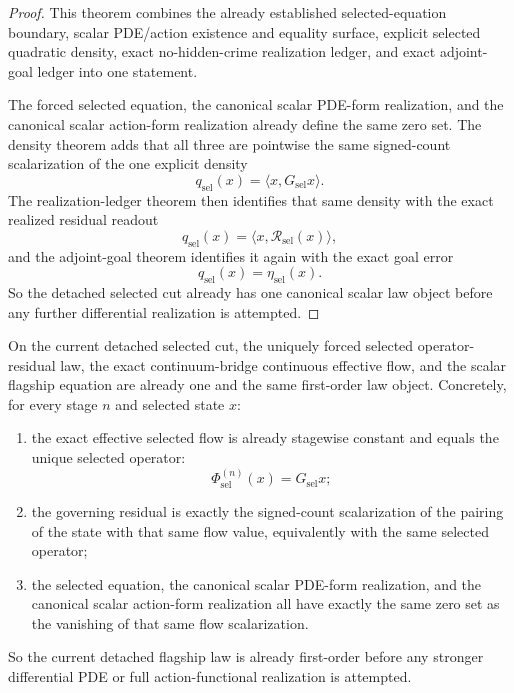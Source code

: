 \begin{proof}
This theorem combines the already established selected-equation boundary,
scalar PDE/action existence and equality surface, explicit selected quadratic
density, exact no-hidden-crime realization ledger, and exact adjoint-goal
ledger into one statement.

The forced selected equation, the canonical scalar PDE-form realization, and
the canonical scalar action-form realization already define the same zero set.
The density theorem adds that all three are pointwise the same signed-count
scalarization of the one explicit density
\[
q_{\mathrm{sel}}(x)=\langle x,G_{\mathrm{sel}}x\rangle.
\]
The realization-ledger theorem then identifies that same density with the exact
realized residual readout
\[
q_{\mathrm{sel}}(x)=\langle x,\mathcal R_{\mathrm{sel}}(x)\rangle,
\]
and the adjoint-goal theorem identifies it again with the exact goal error
\[
q_{\mathrm{sel}}(x)=\eta_{\mathrm{sel}}(x).
\]
So the detached selected cut already has one canonical scalar law object
before any further differential realization is attempted.
\end{proof}

\begin{theorem}
\label{thm:the-selected-cut-already-carries-one-canonical-first-order-law-object}
On the current detached selected cut, the uniquely forced selected
operator-residual law, the exact continuum-bridge continuous effective flow, and the
scalar flagship equation are already one and the same first-order law object.
Concretely, for every stage \(n\) and selected state \(x\):
\begin{enumerate}
\item the exact effective selected flow is already stagewise constant and
      equals the unique selected operator:
\[
\Phi_{\mathrm{sel}}^{(n)}(x)=G_{\mathrm{sel}}x;
\]
\item the governing residual is exactly the signed-count scalarization of the
      pairing of the state with that same flow value, equivalently with the
      same selected operator;
\item the selected equation, the canonical scalar PDE-form realization, and
      the canonical scalar action-form realization all have exactly the same
      zero set as the vanishing of that same flow scalarization.
\end{enumerate}
So the current detached flagship law is already first-order before any
stronger differential PDE or full action-functional realization is attempted.
\end{theorem}

